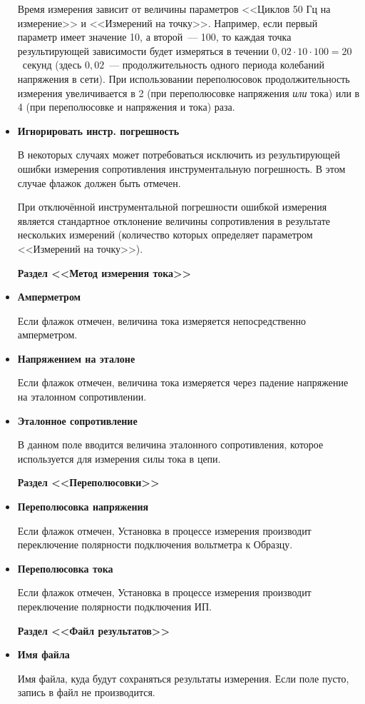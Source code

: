 \documentclass[12pt, a4paper, twocolumn]{report}
\newcommand{\PARAM}[1]{\item {\bf #1} }
\newcommand{\PARAMSECTION}[1]{\vbox{}{\bf Раздел <<#1>>}}
\begin{document}
\begin{itemize}
Время измерения зависит от величины параметров <<Циклов 50 Гц на измерение>> и <<Измерений на точку>>. Например, если первый параметр имеет значение 10, а второй~--- 100, то каждая точка результирующей зависимости будет измеряться в течении $0,02 \cdot 10 \cdot 100 = 20$~секунд (здесь $0,02$~--- продолжительность одного периода колебаний напряжения в сети). При использовании переполюсовок продолжительность измерения увеличивается в 2 (при переполюсовке напряжения \emph{или} тока) или в 4 (при переполюсовке и напряжения и тока) раза.

\PARAM{Игнорировать инстр. погрешность}

В некоторых случаях может потребоваться исключить из результирующей ошибки измерения сопротивления инструментальную погрешность. В этом случае флажок должен быть отмечен.

При отключённой инструментальной погрешности ошибкой измерения является стандартное отклонение величины сопротивления в результате нескольких измерений (количество которых определяет параметром <<Измерений на точку>>).

\PARAMSECTION{Метод измерения тока}

\PARAM{Амперметром}

Если флажок отмечен, величина тока измеряется непосредственно амперметром.

\PARAM{Напряжением на эталоне}

Если флажок отмечен, величина тока измеряется через падение напряжение на эталонном сопротивлении.

\PARAM{Эталонное сопротивление}

В данном поле вводится величина эталонного сопротивления, которое используется для измерения силы тока в цепи.

\PARAMSECTION{Переполюсовки}

\PARAM{Переполюсовка напряжения}

Если флажок отмечен, Установка в процессе измерения производит переключение полярности подключения вольтметра к Образцу.

\PARAM{Переполюсовка тока}

Если флажок отмечен, Установка в процессе измерения производит переключение полярности подключения ИП.

\PARAMSECTION{Файл результатов}

\PARAM{Имя файла}

Имя файла, куда будут сохраняться результаты измерения. Если поле пусто, запись в файл не производится.


\end{itemize}
\end{document}
